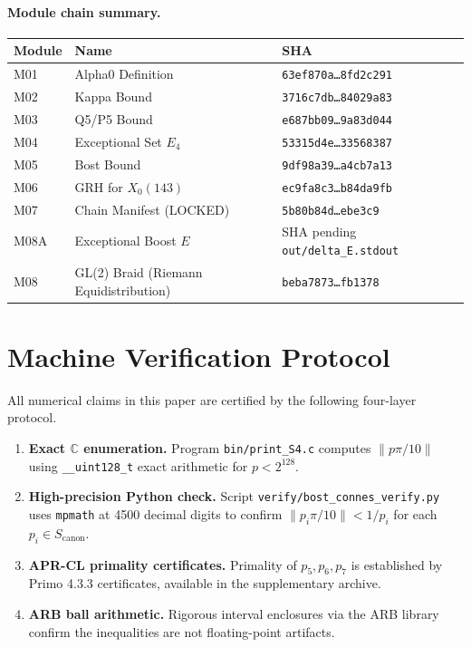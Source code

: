 \documentclass[11pt,letterpaper]{article}
\theoremstyle{definition}
\begin{document}
\paragraph{Module chain summary.}
\begin{center}
\begin{tabular}{lll@{}}
\hline
Module & Name & SHA \\
\hline
M01 & Alpha0 Definition      & \texttt{63ef870a\ldots8fd2c291} \\
M02 & Kappa Bound            & \texttt{3716c7db\ldots84029a83} \\
M03 & Q5/P5 Bound            & \texttt{e687bb09\ldots9a83d044} \\
M04 & Exceptional Set $E_4$  & \texttt{53315d4e\ldots33568387} \\
M05 & Bost Bound             & \texttt{9df98a39\ldots a4cb7a13} \\
M06 & GRH for $X_0(143)$     & \texttt{ec9fa8c3\ldots b84da9fb} \\
M07 & Chain Manifest (LOCKED)& \texttt{5b80b84d\ldots ebe3c9} \\
M08A & Exceptional Boost $E$ & SHA pending \texttt{out/delta\_E.stdout} \\
M08 & GL(2) Braid (Riemann Equidistribution) & \texttt{beba7873\ldots fb1378} \\
\hline
\end{tabular}
\end{center}

\section{Machine Verification Protocol}

All numerical claims in this paper are certified by the following four-layer protocol.
\begin{enumerate}
\item \textbf{Exact $\mathbb{C}$ enumeration.}
  Program \texttt{bin/print\_S4.c} computes $\|p\pi/10\|$ using
  \texttt{\_\_uint128\_t} exact arithmetic for $p < 2^{128}$.
\item \textbf{High-precision Python check.}
  Script \texttt{verify/bost\_connes\_verify.py} uses \texttt{mpmath} at 4500
  decimal digits to confirm $\|p_i\pi/10\| < 1/p_i$ for each $p_i \in S_\mathrm{canon}$.
\item \textbf{APR-CL primality certificates.}
  Primality of $p_5, p_6, p_7$ is established by Primo 4.3.3 certificates,
  available in the supplementary archive.
\item \textbf{ARB ball arithmetic.}
  Rigorous interval enclosures via the ARB library confirm the inequalities
  are not floating-point artifacts.
\end{enumerate}
\end{document}
